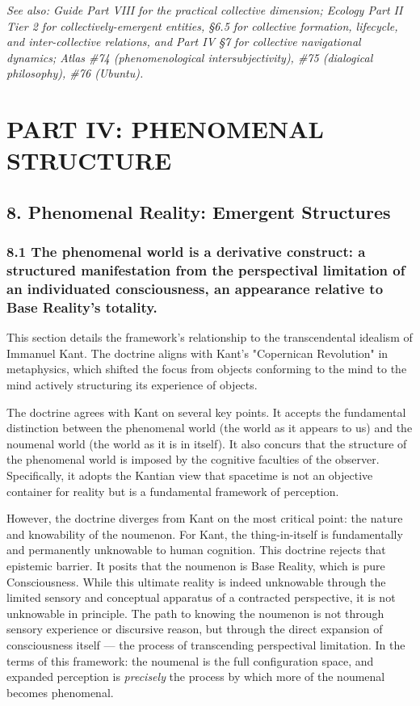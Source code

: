\textit{See also: Guide Part VIII for the practical collective dimension; Ecology Part II Tier 2 for collectively-emergent entities, §6.5 for collective formation, lifecycle, and inter-collective relations, and Part IV §7 for collective navigational dynamics; Atlas \#74 (phenomenological intersubjectivity), \#75 (dialogical philosophy), \#76 (Ubuntu).}


\bigskip\noindent\makebox[\textwidth]{\color{rulegray}\rule{5cm}{0.3pt}}\bigskip


\chapter*{PART IV: PHENOMENAL STRUCTURE}


\section*{8. Phenomenal Reality: Emergent Structures}


\subsection*{8.1 The phenomenal world is a derivative construct: a structured manifestation from the perspectival limitation of an individuated consciousness, an appearance relative to Base Reality's totality.}


This section details the framework's relationship to the transcendental idealism of Immanuel Kant. The doctrine aligns with Kant's "Copernican Revolution" in metaphysics, which shifted the focus from objects conforming to the mind to the mind actively structuring its experience of objects.


The doctrine agrees with Kant on several key points. It accepts the fundamental distinction between the phenomenal world (the world as it appears to us) and the noumenal world (the world as it is in itself). It also concurs that the structure of the phenomenal world is imposed by the cognitive faculties of the observer. Specifically, it adopts the Kantian view that spacetime is not an objective container for reality but is a fundamental framework of perception.


However, the doctrine diverges from Kant on the most critical point: the nature and knowability of the noumenon. For Kant, the thing-in-itself is fundamentally and permanently unknowable to human cognition. This doctrine rejects that epistemic barrier. It posits that the noumenon is Base Reality, which is pure Consciousness. While this ultimate reality is indeed unknowable through the limited sensory and conceptual apparatus of a contracted perspective, it is not unknowable in principle. The path to knowing the noumenon is not through sensory experience or discursive reason, but through the direct expansion of consciousness itself — the process of transcending perspectival limitation. In the terms of this framework: the noumenal is the full configuration space, and expanded perception is \textit{precisely} the process by which more of the noumenal becomes phenomenal.


